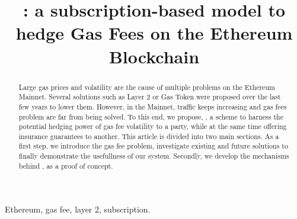 
    


\title{\projectName : a subscription-based model to hedge Gas Fees on the Ethereum Blockchain\\
}

\author{
\and
{}
\and
{}
\and
{}

}

\maketitle
\thispagestyle{plain}
\pagestyle{plain}

\begin{abstract}
Large gas prices and volatility are the cause of multiple problems on the Ethereum Mainnet. Several solutions such as Layer 2 or Gas Token were proposed over the last few years to lower them. However, in the Mainnet, traffic keeps increasing and gas fees problem are far from being solved. To this end, we propose, \projectName, a scheme to harness the potential hedging power of gas fee volatility to a party, while at the same time offering insurance guarantees to another. 
This article is divided into two main sections. As a first step, we introduce the gas fee problem, investigate existing and future solutions to finally demonstrate the usefullness of our system. Secondly, we develop the mechanisms behind \projectName, as a proof of concept. 
\end{abstract}

\begin{IEEEkeywords}
Ethereum, gas fee, layer 2, subscription.
\end{IEEEkeywords}